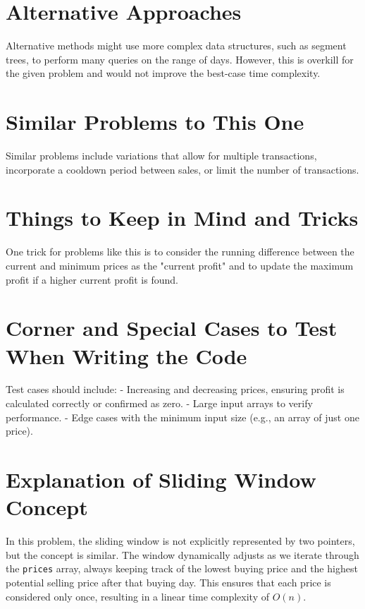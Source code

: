 \section*{Alternative Approaches}
Alternative methods might use more complex data structures, such as segment trees, to perform many queries on the range of days. However, this is overkill for the given problem and would not improve the best-case time complexity.

\section*{Similar Problems to This One}
Similar problems include variations that allow for multiple transactions, incorporate a cooldown period between sales, or limit the number of transactions.

\section*{Things to Keep in Mind and Tricks}
One trick for problems like this is to consider the running difference between the current and minimum prices as the "current profit" and to update the maximum profit if a higher current profit is found.

\section*{Corner and Special Cases to Test When Writing the Code}
Test cases should include:
- Increasing and decreasing prices, ensuring profit is calculated correctly or confirmed as zero.
- Large input arrays to verify performance.
- Edge cases with the minimum input size (e.g., an array of just one price).

\section*{Explanation of Sliding Window Concept}
In this problem, the sliding window is not explicitly represented by two pointers, but the concept is similar. The window dynamically adjusts as we iterate through the \texttt{prices} array, always keeping track of the lowest buying price and the highest potential selling price after that buying day. This ensures that each price is considered only once, resulting in a linear time complexity of \(O(n)\).
